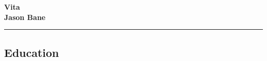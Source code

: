 


\setlength{\tabcolsep}{0em}





\newenvironment{indentsection}[1]%
{\begin{list}{}%
		{\setlength{\leftmargin}{#1}}%
		\item[]%
	}
	{\end{list}}

\newenvironment{unindentsection}[1]%
{\begin{list}{}%
		{\setlength{\leftmargin}{-0.5#1}}%
		\item[]%
	}
	{\end{list}}

\newcommand{\headerrow}[2]
{\begin{tabular*}{\linewidth}{l@{\extracolsep{\fill}}r}
		#1 &
		#2 \\
\end{tabular*}}

\newcommand{\CPP}
{C\nolinebreak[4]\hspace{-.05em}\raisebox{.22ex}{\footnotesize\bf ++}}

\begin{center}
{\large \textbf{Vita}}\\
{\large \textbf{Jason Bane}}

\end{center}

\hrule
\vspace{-0.4em}
\subsection*{Education}

